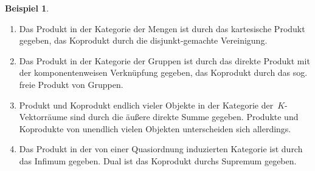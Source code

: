 \documentclass[a4paper,ngerman]{scrartcl}
\theoremstyle{definition}
\newtheorem{bsp}[defn]{Beispiel}
\theoremstyle{plain}
\theoremstyle{remark}
\begin{document}
\begin{bsp}\begin{enumerate}
\item Das Produkt in der Kategorie der Mengen ist durch das kartesische Produkt
gegeben, das Koprodukt durch die disjunkt-gemachte Vereinigung.
\item Das Produkt in der Kategorie der Gruppen ist durch das direkte Produkt
mit der komponentenweisen Verknüpfung gegeben, das Koprodukt durch das sog.
freie Produkt von Gruppen.
\item Produkt und Koprodukt endlich vieler Objekte in der Kategorie
der~$K$-Vektorräume sind durch die äußere direkte Summe gegeben. Produkte und
Koprodukte von unendlich vielen Objekten unterscheiden sich allerdings.
\item Das Produkt in der von einer Quasiordnung induzierten Kategorie ist durch
das Infimum gegeben. Dual ist das Koprodukt
durchs Supremum gegeben.
\end{enumerate}\end{bsp}
\end{document}
